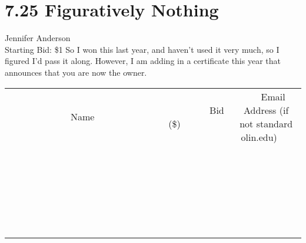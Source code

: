 \documentclass[11pt]{article}
\begin{document}
\section*{7.25 Figuratively Nothing}
Jennifer Anderson
\\
Starting Bid: \$1
\newline
So I won this last year, and haven't used it very much, so I figured I'd pass it along. However, I am adding in a certificate this year that announces that you are now the owner.
\\[6ex]
\begin{tabular}{c c c}
~~~~~~~~~~~~~Name~~~~~~~~~~~~~ & ~~~~~~~~~Bid (\$)~~~~~~~~~  & ~~~Email Address (if not standard olin.edu)~~~\\
 & & \\
\hline
 & & \\
\hline
 & & \\
\hline
 & & \\
\hline
 & & \\
\hline
 & & \\
\hline
 & & \\
\hline
 & & \\
\hline
 & & \\
\hline
 & & \\
\hline
 & & \\
\hline
 & & \\
\hline
 & & \\
\hline
 & & \\
\hline
 & & \\
\hline
 & & \\
\hline
 & & \\
\hline
 & & \\
\hline
 & & \\
\hline
 & & \\
\hline
 & & \\
\hline
 & & \\
\hline
 & & \\
\hline
 & & \\
\hline
 & & \\
\hline
 & & \\
\hline
\end{tabular}
\newpage
\end{document}
